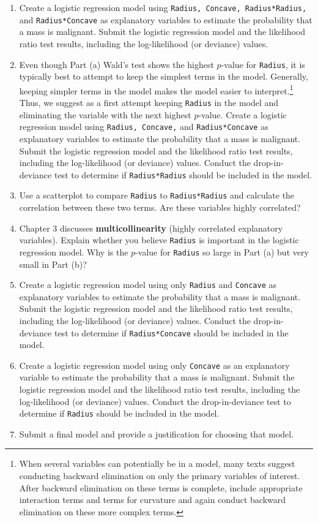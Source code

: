 \documentclass[
]{report}
\begin{document}
\begin{enumerate}
  \begin{enumerate}
    \item Create a logistic regression model using \texttt{Radius, Concave, Radius*Radius,} and \texttt{Radius*Concave} as explanatory variables to estimate the probability that a mass is malignant. Submit the logistic regression model and the likelihood ratio test results, including the log-likelihood (or deviance) values.
    \item Even though Part (a) Wald’s test shows the highest $\scriptstyle p$-value for \texttt{Radius}, it is typically best to attempt to keep the simplest terms in the model. Generally, keeping simpler terms in the model makes the model easier to interpret.\footnote{When several variables can potentially be in a model, many texts suggest conducting backward elimination on only the primary variables of interest. After backward elimination on these terms is complete, include appropriate interaction terms and terms for curvature and again conduct backward elimination on these more complex terms.} Thus, we suggest as a first attempt keeping \texttt{Radius} in the model and eliminating the variable with the next highest $\scriptstyle p$-value. Create a logistic regression model using \texttt{Radius, Concave,} and \texttt{Radius*Concave} as explanatory variables to estimate the probability that a mass is malignant. Submit the logistic regression model and the likelihood ratio test results, including the log-likelihood (or deviance) values. Conduct the drop-in-deviance test to determine if \texttt{Radius*Radius} should be included in the model.
    \item Use a scatterplot to compare \texttt{Radius} to \texttt{Radius*Radius} and calculate the correlation between these two terms. Are these variables highly correlated?
    \item Chapter 3 discusses \textbf{multicollinearity} (highly correlated explanatory variables). Explain whether you believe \texttt{Radius} is important in the logistic regression model. Why is the $\scriptstyle p$-value for \texttt{Radius} so large in Part (a) but very small in Part (b)?
    \item Create a logistic regression model using only \texttt{Radius} and \texttt{Concave} as explanatory variables to estimate the probability that a mass is malignant. Submit the logistic regression model and the likelihood ratio test results, including the log-likelihood (or deviance) values. Conduct the drop-in-deviance test to determine if \texttt{Radius*Concave} should be included in the model.
    \item Create a logistic regression model using only \texttt{Concave} as an explanatory variable to estimate the probability that a mass is malignant. Submit the logistic regression model and the likelihood ratio test results, including the log-likelihood (or deviance) values. Conduct the drop-in-deviance test to determine if \texttt{Radius} should be included in the model.
    \item Submit a final model and provide a justification for choosing that model.
  \end{enumerate}


\end{enumerate}
\end{document}
